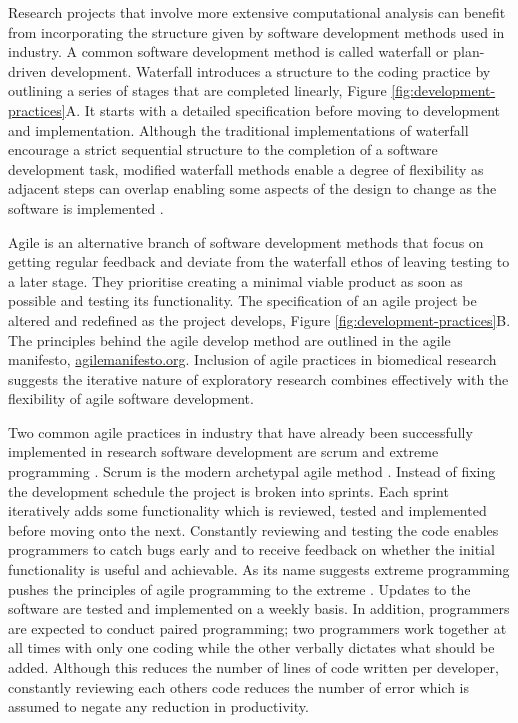 \documentclass[../main.tex]{subfiles}
\begin{document}
Research projects that involve more extensive computational analysis can benefit from incorporating the structure given by software development methods used in industry.
A common software development method is called waterfall or plan-driven development.
Waterfall introduces a structure to the coding practice by outlining a series of stages that are completed linearly, Figure \ref{fig:development-practices}A.
It starts with a detailed specification before moving to development and implementation.
Although the traditional implementations of waterfall encourage a strict sequential structure to the completion of a software development task, modified waterfall methods enable a degree of flexibility as adjacent steps can overlap enabling some aspects of the design to change as the software is implemented \parencite{McConnell1996}. 

Agile is an alternative branch of software development methods that focus on getting regular feedback and deviate from the waterfall ethos of leaving testing to a later stage.
They prioritise creating a minimal viable product as soon as possible and testing its functionality.
The specification of an agile project be altered and redefined as the project develops, Figure \ref{fig:development-practices}B. 
The principles behind the agile develop method are outlined in the agile manifesto, \href{https://agilemanifesto.org/principles.html}{agilemanifesto.org}.
Inclusion of agile practices in biomedical research suggests the iterative nature of exploratory research combines effectively with the flexibility of agile software development\parencite{kane2006}.

Two common agile practices in industry that have already been successfully implemented in research software development are scrum and extreme programming \parencite{Sletholt2011,Sadath2018}.
Scrum is the modern archetypal agile method \parencite{Schwaber2020}.
Instead of fixing the development schedule the project is broken into sprints.
Each sprint iteratively adds some functionality which is reviewed, tested and implemented before moving onto the next.
Constantly reviewing and testing the code enables programmers to catch bugs early and to receive feedback on whether the initial functionality is useful and achievable.
As its name suggests extreme programming pushes the principles of agile programming to the extreme \parencite{Beck2004}.
Updates to the software are tested and implemented on a weekly basis. 
In addition, programmers are expected to conduct paired programming; 
two programmers work together at all times with only one coding while the other verbally dictates what should be added. 
Although this reduces the number of lines of code written per developer, constantly reviewing each others code reduces the number of error which is assumed to negate any reduction in productivity.
\end{document}
